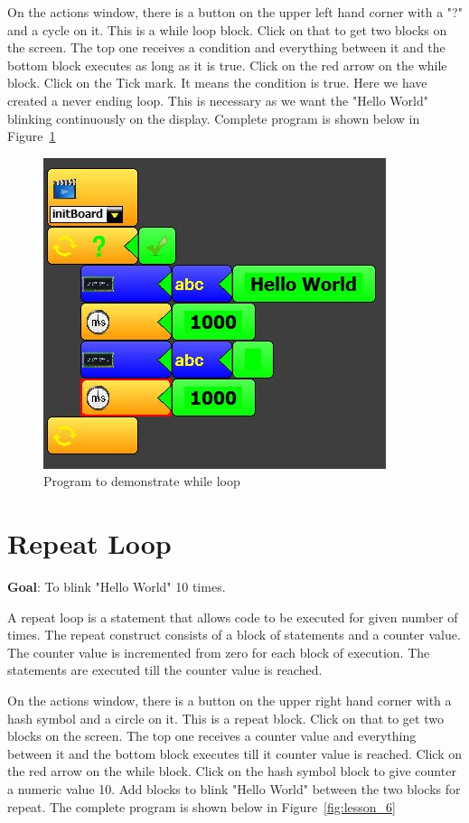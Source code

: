 On the actions window, there is a button on the upper left hand corner with a "?" and a cycle on it. This is a while loop block. Click on that to get two blocks on the screen. The top one receives a condition and everything between it and the bottom block executes as long as it is true. Click on the red arrow on the while block. Click on the Tick mark. It means the condition is true. Here we have created a never ending loop. This is necessary as we want the "Hello World" blinking continuously on the display. Complete program is shown below in Figure~\ref{fig:lesson_5}

\begin{figure}[h]
\centering
\includegraphics[width=0.5\columnwidth]{Images/Manual/lesson_5}
\caption{Program to demonstrate while loop}
\label{fig:lesson_5}
\end{figure}

\section{Repeat Loop}

\textbf{Goal}: To blink "Hello World" 10 times.

A repeat loop is a statement that allows code to be executed for given number of times. The repeat construct consists of a block of statements and a counter value. The counter value is incremented from zero for each block of execution. The statements are executed till the counter value is reached. 

On the actions window, there is a button on the upper right hand corner with a hash symbol and a circle on it. This is a repeat block. Click on that to get two blocks on the screen. The top one receives a counter value and everything between it and the bottom block executes till it counter value is reached. Click on the red arrow on the while block. Click on the hash symbol block to give counter a numeric value 10. Add blocks to blink "Hello World" between the two blocks for repeat. The complete program is shown below in Figure~\ref{fig:lesson_6}

